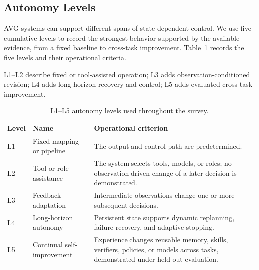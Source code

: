 \subsection{Autonomy Levels}
\label{sec:agentic-visual-generation-autonomy}

AVG systems can support different spans of state-dependent control. We use five cumulative levels to record the strongest behavior supported by the available evidence, from a fixed baseline to cross-task improvement. Table~\ref{tab:autonomy} records the five levels and their operational criteria.

\begin{keytakeaway}
L1--L2 describe fixed or tool-assisted operation; L3 adds observation-conditioned revision; L4 adds long-horizon recovery and control; L5 adds evaluated cross-task improvement.
\end{keytakeaway}

\begin{table}[t]
  \caption{L1--L5 autonomy levels used throughout the survey.}
  \label{tab:autonomy}
  \small
  \begin{tabularx}{\columnwidth}{@{}llX@{}}
    \toprule
    Level & Name & Operational criterion \\
    \midrule
    L1 & Fixed mapping or pipeline & The output and control path are predetermined. \\
    L2 & Tool or role assistance & The system selects tools, models, or roles; no observation-driven change of a later decision is demonstrated. \\
    L3 & Feedback adaptation & Intermediate observations change one or more subsequent decisions. \\
    L4 & Long-horizon autonomy & Persistent state supports dynamic replanning, failure recovery, and adaptive stopping. \\
    L5 & Continual self-improvement & Experience changes reusable memory, skills, verifiers, policies, or models across tasks, demonstrated under held-out evaluation. \\
    \bottomrule
  \end{tabularx}
\end{table}

